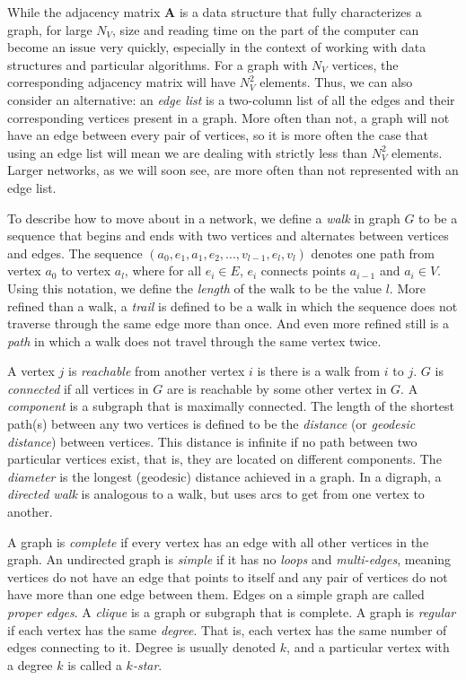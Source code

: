 \documentclass[12pt,twoside]{amherstthesis}
\begin{document}
  While the adjacency matrix \(\textbf{A}\) is a data structure that fully
  characterizes a graph, for large \(N_{V}\), size and reading time on the
  part of the computer can become an issue very quickly, especially in the
  context of working with data structures and particular algorithms. For a
  graph with \(N_{V}\) vertices, the corresponding adjacency matrix will
  have \(N_{V}^{2}\) elements. Thus, we can also consider an alternative:
  an \emph{edge list} is a two-column list of all the edges and their
  corresponding vertices present in a graph. More often than not, a graph
  will not have an edge between every pair of vertices, so it is more
  often the case that using an edge list will mean we are dealing with
  strictly less than \(N_{V}^{2}\) elements. Larger networks, as we will
  soon see, are more often than not represented with an edge list.
  
  To describe how to move about in a network, we define a \emph{walk} in
  graph \(G\) to be a sequence that begins and ends with two vertices and
  alternates between vertices and edges. The sequence
  \((a_0, e_1, a_1, e_2, ..., v_{l-1}, e_l, v_l)\) denotes one path from
  vertex \(a_0\) to vertex \(a_l\), where for all \(e_i \in E\), \(e_i\)
  connects points \(a_{i-1}\) and \(a_i \in V\). Using this notation, we
  define the \emph{length} of the walk to be the value \(l\). More refined
  than a walk, a \emph{trail} is defined to be a walk in which the
  sequence does not traverse through the same edge more than once. And
  even more refined still is a \emph{path} in which a walk does not travel
  through the same vertex twice.
  
  A vertex \(j\) is \emph{reachable} from another vertex \(i\) is there is
  a walk from \(i\) to \(j\). \(G\) is \emph{connected} if all vertices in
  \(G\) are is reachable by some other vertex in \(G\). A \emph{component}
  is a subgraph that is maximally connected. The length of the shortest
  path(s) between any two vertices is defined to be the \emph{distance}
  (or \emph{geodesic distance}) between vertices. This distance is
  infinite if no path between two particular vertices exist, that is, they
  are located on different components. The \emph{diameter} is the longest
  (geodesic) distance achieved in a graph. In a digraph, a \emph{directed
  walk} is analogous to a walk, but uses arcs to get from one vertex to
  another.
  
  A graph is \emph{complete} if every vertex has an edge with all other
  vertices in the graph. An undirected graph is \emph{simple} if it has no
  \emph{loops} and \emph{multi-edges}, meaning vertices do not have an
  edge that points to itself and any pair of vertices do not have more
  than one edge between them. Edges on a simple graph are called
  \emph{proper edges}. A \emph{clique} is a graph or subgraph that is
  complete. A graph is \emph{regular} if each vertex has the same
  \emph{degree}. That is, each vertex has the same number of edges
  connecting to it. Degree is usually denoted \(k\), and a particular
  vertex with a degree \(k\) is called a \emph{\(k\)-star}.
  
\end{document}
